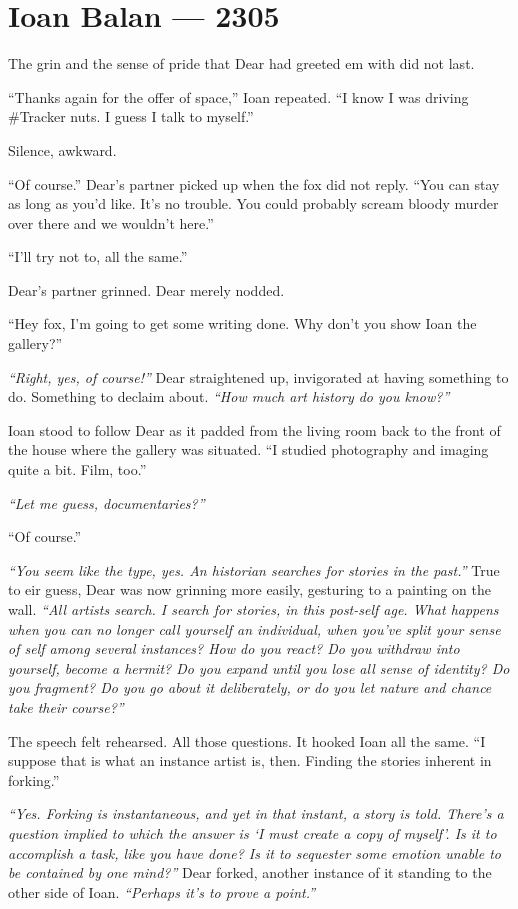 \hypertarget{ioan-balan-2305}{%
\chapter*{Ioan Balan — 2305}\label{ioan-balan-2305}}

The grin and the sense of pride that Dear had greeted em with did not last.

``Thanks again for the offer of space,'' Ioan repeated. ``I know I was driving \#Tracker nuts. I guess I talk to myself.''

Silence, awkward.

``Of course.'' Dear's partner picked up when the fox did not reply. ``You can stay as long as you'd like. It's no trouble. You could probably scream bloody murder over there and we wouldn't here.''

``I'll try not to, all the same.''

Dear's partner grinned. Dear merely nodded.

``Hey fox, I'm going to get some writing done. Why don't you show Ioan the gallery?''

\emph{``Right, yes, of course!''} Dear straightened up, invigorated at having something to do. Something to declaim about. \emph{``How much art history do you know?''}

Ioan stood to follow Dear as it padded from the living room back to the front of the house where the gallery was situated. ``I studied photography and imaging quite a bit. Film, too.''

\emph{``Let me guess, documentaries?''}

``Of course.''

\emph{``You seem like the type, yes. An historian searches for stories in the past.''} True to eir guess, Dear was now grinning more easily, gesturing to a painting on the wall. \emph{``All artists search. I search for stories, in this post-self age. What happens when you can no longer call yourself an individual, when you've split your sense of self among several instances? How do you react? Do you withdraw into yourself, become a hermit? Do you expand until you lose all sense of identity? Do you fragment? Do you go about it deliberately, or do you let nature and chance take their course?''}

The speech felt rehearsed. All those questions. It hooked Ioan all the same. ``I suppose that is what an instance artist is, then. Finding the stories inherent in forking.''

\emph{``Yes. Forking is instantaneous, and yet in that instant, a story is told. There's a question implied to which the answer is `I must create a copy of myself'. Is it to accomplish a task, like you have done? Is it to sequester some emotion unable to be contained by one mind?''} Dear forked, another instance of it standing to the other side of Ioan. \emph{``Perhaps it's to prove a point.''}

